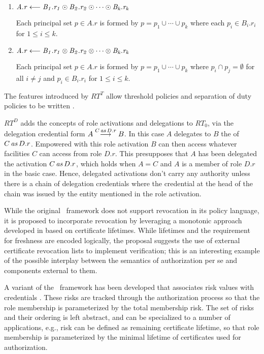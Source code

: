 \begin{enumerate}

\item $\cred{A.r}{B_1.r_1 \odot B_2.r_2 \odot \cdots \odot B_k.r_k}{}$ 

  Each principal set $p \in A.r$ is formed by $p = p_1 \cup \cdots \cup p_k$ where each $p_i \in
  B_i.r_i$ for $1 \le i \le k$.

\item $\cred{A.r}{B_1.r_1 \otimes B_2.r_2 \otimes \cdots \otimes B_k.r_k}{}$ 

  Each principal set $p \in A.r$ is formed by $p = p_1 \cup \cdots \cup p_k$ where $p_i \cap p_j
  = \emptyset$ for all $i \ne j$ and $p_i \in B_i.r_i$ for $1 \le i \le k$.

\end{enumerate}

The features introduced by $RT^T$ allow threshold policies and separation of duty policies to
be written \cite{Li:DRBTMF}.

$RT^D$ adds the concepts of role activations and delegations to $RT_0$, via the delegation
credential form $\delcred{A}{B}{\activation{C}{D.r}}$. In this case $A$ delegates to $B$ the
 of $\activation{C}{D.r}$. Empowered with this role activation $B$ can
then access whatever facilities $C$ can access from role $D.r$. This presupposes that $A$ has
been delegated the activation $\activation{C}{D.r}$, which holds when $A = C$ and $A$ is a
member of role $D.r$ in the basic case. Hence, delegated activations don't carry any authority
unless there is a chain of delegation credentials where the credential at the head of the chain
was issued by the entity mentioned in the role activation.

While the original \RT\ framework does not support revocation in its policy language, it is
proposed to incorporate revocation \cite{Li:DRBTMF} by leveraging a monotonic approach developed
in \cite{lbi-fc01} based on certificate lifetimes. While lifetimes and the requirement for
freshness are encoded logically, the proposal suggests the use of external certificate
revocation lists to implement verification; this is an interesting example of the possible
interplay between the semantics of authorization per se and components external to them.

A variant of the \RT\ framework has been developed that associates risk values with credentials
\cite{skalka-wang-chapin-jcs06}. These risks are tracked through the authorization process so
that the role membership is parameterized by the total membership risk. The set of risks and
their ordering is left abstract, and can be specialized to a number of applications, e.g., risk
can be defined as remaining certificate lifetime, so that role membership is parameterized by
the minimal lifetime of certificates used for authorization.

